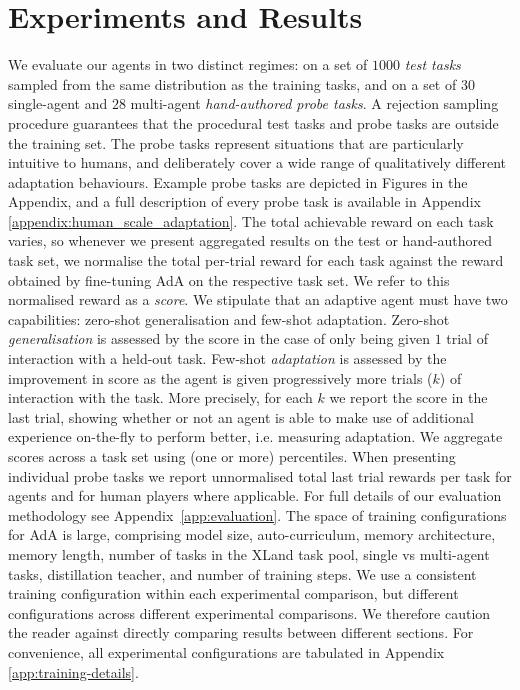 \documentclass[11pt, a4paper, logo, copyright]{deepmind}
\begin{document}
\section{Experiments and Results}
We evaluate our agents in two distinct regimes: on a set of $1000$ \textit{test tasks} sampled from the same distribution as the training tasks, and on a set of $30$ single-agent and $28$ multi-agent \emph{hand-authored probe tasks}. A rejection sampling procedure guarantees that the procedural test tasks and probe tasks are outside the training set. The probe tasks represent situations that are particularly intuitive to humans, and deliberately cover a wide range of qualitatively different adaptation behaviours. Example probe tasks are depicted in Figures  in the Appendix, and a full description of every probe task is available in Appendix \ref{appendix:human_scale_adaptation}.
The total achievable reward on each task varies, so whenever we present aggregated results on the test or hand-authored task set, we normalise the total per-trial reward for each task against the reward obtained by fine-tuning AdA on the respective task set. We refer to this normalised reward as a \textit{score}. We stipulate that an adaptive agent must have two capabilities: zero-shot generalisation and few-shot adaptation. Zero-shot \textit{generalisation} is assessed by the score in the case of only being given $1$ trial of interaction with a held-out task. Few-shot \textit{adaptation} is assessed by the improvement in score as the agent is given progressively more trials ($k$) of interaction with the task. More precisely, for each $k$ we report the score in the last trial, showing whether or not an agent is able to make use of additional experience on-the-fly to perform better, i.e. measuring adaptation.
We aggregate scores across a task set using (one or more) percentiles. When presenting individual probe tasks we report unnormalised total last trial rewards per task for agents and for human players where applicable. For full details of our evaluation methodology see Appendix~\ref{app:evaluation}.
The space of training configurations for AdA is large, comprising model size, auto-curriculum, memory architecture, memory length, number of tasks in the XLand task pool, single vs multi-agent tasks, distillation teacher, and number of training steps. We use a consistent training configuration within each experimental comparison, but different configurations across different experimental comparisons. We therefore caution the reader against directly comparing results between different sections. For convenience, all experimental configurations are tabulated in Appendix \ref{app:training-details}.
\end{document}
